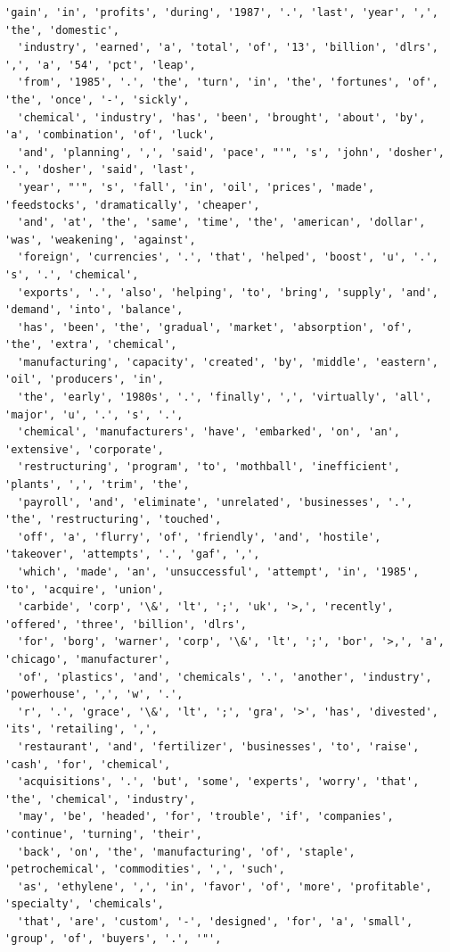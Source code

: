 \documentclass[18pt]{article}
\begin{document}
\begin{Verbatim}[commandchars=\\\{\}]
  'gain', 'in', 'profits', 'during', '1987', '.', 'last', 'year', ',', 'the', 'domestic',
  'industry', 'earned', 'a', 'total', 'of', '13', 'billion', 'dlrs', ',', 'a', '54', 'pct', 'leap',
  'from', '1985', '.', 'the', 'turn', 'in', 'the', 'fortunes', 'of', 'the', 'once', '-', 'sickly',
  'chemical', 'industry', 'has', 'been', 'brought', 'about', 'by', 'a', 'combination', 'of', 'luck',
  'and', 'planning', ',', 'said', 'pace', "'", 's', 'john', 'dosher', '.', 'dosher', 'said', 'last',
  'year', "'", 's', 'fall', 'in', 'oil', 'prices', 'made', 'feedstocks', 'dramatically', 'cheaper',
  'and', 'at', 'the', 'same', 'time', 'the', 'american', 'dollar', 'was', 'weakening', 'against',
  'foreign', 'currencies', '.', 'that', 'helped', 'boost', 'u', '.', 's', '.', 'chemical',
  'exports', '.', 'also', 'helping', 'to', 'bring', 'supply', 'and', 'demand', 'into', 'balance',
  'has', 'been', 'the', 'gradual', 'market', 'absorption', 'of', 'the', 'extra', 'chemical',
  'manufacturing', 'capacity', 'created', 'by', 'middle', 'eastern', 'oil', 'producers', 'in',
  'the', 'early', '1980s', '.', 'finally', ',', 'virtually', 'all', 'major', 'u', '.', 's', '.',
  'chemical', 'manufacturers', 'have', 'embarked', 'on', 'an', 'extensive', 'corporate',
  'restructuring', 'program', 'to', 'mothball', 'inefficient', 'plants', ',', 'trim', 'the',
  'payroll', 'and', 'eliminate', 'unrelated', 'businesses', '.', 'the', 'restructuring', 'touched',
  'off', 'a', 'flurry', 'of', 'friendly', 'and', 'hostile', 'takeover', 'attempts', '.', 'gaf', ',',
  'which', 'made', 'an', 'unsuccessful', 'attempt', 'in', '1985', 'to', 'acquire', 'union',
  'carbide', 'corp', '\&', 'lt', ';', 'uk', '>,', 'recently', 'offered', 'three', 'billion', 'dlrs',
  'for', 'borg', 'warner', 'corp', '\&', 'lt', ';', 'bor', '>,', 'a', 'chicago', 'manufacturer',
  'of', 'plastics', 'and', 'chemicals', '.', 'another', 'industry', 'powerhouse', ',', 'w', '.',
  'r', '.', 'grace', '\&', 'lt', ';', 'gra', '>', 'has', 'divested', 'its', 'retailing', ',',
  'restaurant', 'and', 'fertilizer', 'businesses', 'to', 'raise', 'cash', 'for', 'chemical',
  'acquisitions', '.', 'but', 'some', 'experts', 'worry', 'that', 'the', 'chemical', 'industry',
  'may', 'be', 'headed', 'for', 'trouble', 'if', 'companies', 'continue', 'turning', 'their',
  'back', 'on', 'the', 'manufacturing', 'of', 'staple', 'petrochemical', 'commodities', ',', 'such',
  'as', 'ethylene', ',', 'in', 'favor', 'of', 'more', 'profitable', 'specialty', 'chemicals',
  'that', 'are', 'custom', '-', 'designed', 'for', 'a', 'small', 'group', 'of', 'buyers', '.', '"',

\end{Verbatim}
\end{document}
